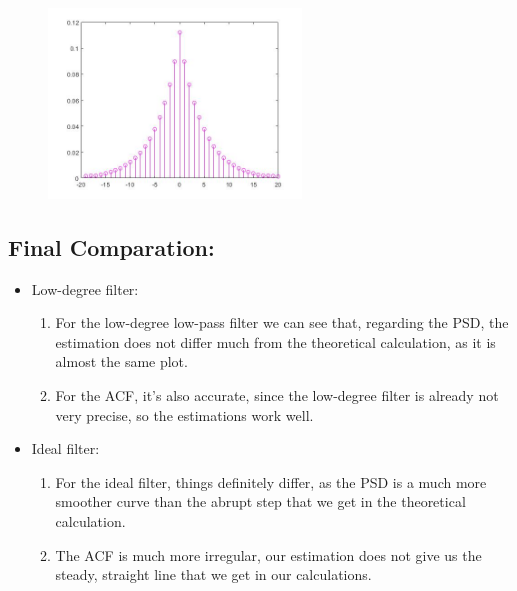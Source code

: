 \documentclass[a4paper,11pt]{article}
\begin{document}
\begin{figure}[!hp]
    \begin{center}
    \includegraphics[width=0.6\textwidth]{images/lab2_figure4.jpg}
    \end{center}
\end{figure}

\newpage

\subsection{Final Comparation:}

\begin{itemize}

\item Low-degree filter:

\begin{enumerate}

\item For the low-degree low-pass filter we can see that, regarding the PSD, the estimation does not differ much from the theoretical calculation, as it is almost the same plot.
\item For the ACF, it's also accurate, since the low-degree filter is already not very precise, so the estimations work well.

\end{enumerate}

\item Ideal filter:

\begin{enumerate}

\item For the ideal filter, things definitely differ, as the PSD is a much more smoother curve than the abrupt step that we get in the theoretical calculation.
\item The ACF is much more irregular, our estimation does not give us the steady, straight line that we get in our calculations.

\end{enumerate}

\end{itemize}
\end{document}
